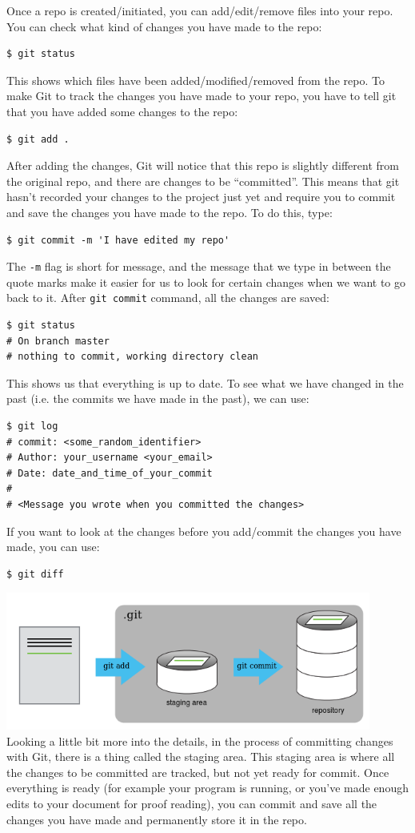 \documentclass[a4paper, 12pt]{article}
\begin{document}
Once a repo is created/initiated, you can add/edit/remove files into your repo.
You can check what kind of changes you have made to the repo:
\begin{lstlisting}
$ git status
\end{lstlisting}
This shows which files have been added/modified/removed from the repo.
To make Git to track the changes you have made to your repo, you have to tell git that you have added some changes to the repo:
\begin{lstlisting}
$ git add .
\end{lstlisting}
After adding the changes, Git will notice that this repo is slightly different from the original repo, and there are changes to be ``committed''.
This means that git hasn't recorded your changes to the project just yet and require you to commit and save the changes you have made to the repo.
To do this, type:
\begin{lstlisting}
$ git commit -m 'I have edited my repo'
\end{lstlisting}
The \verb|-m| flag is short for message, and the message that we type in between the quote marks make it easier for us to look for certain changes when we want to go back to it.
After \verb|git commit| command, all the changes are saved:
\begin{lstlisting}
$ git status
# On branch master
# nothing to commit, working directory clean
\end{lstlisting}
This shows us that everything is up to date.
To see what we have changed in the past (i.e. the commits we have made in the past), we can use:
\begin{lstlisting}
$ git log
# commit: <some_random_identifier>
# Author: your_username <your_email>
# Date: date_and_time_of_your_commit
# 
# <Message you wrote when you committed the changes>
\end{lstlisting}
If you want to look at the changes before you add/commit the changes you have made, you can use:
\begin{lstlisting}
$ git diff
\end{lstlisting}

\includegraphics[width=0.9\textwidth]{./images/staging}
\\Looking a little bit more into the details, in the process of committing changes with Git, there is a thing called the staging area.
This staging area is where all the changes to be committed are tracked, but not yet ready for commit.
Once everything is ready (for example your program is running, or you've made enough edits to your document for proof reading), you can commit and save all the changes you have made and permanently store it in the repo.
\end{document}
